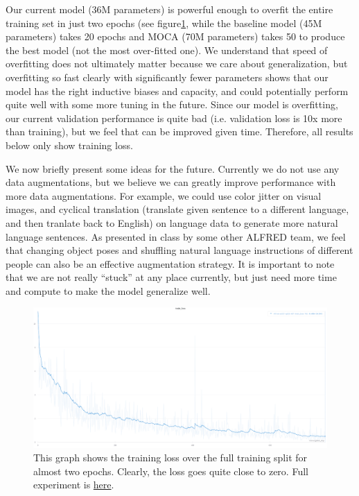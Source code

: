 \documentclass[11pt,a4paper]{article}
\begin{document}
Our current model (36M parameters) is powerful enough to overfit the entire training set in just two epochs (see figure\ref{fig:overfit}, while the baseline model (45M parameters) takes 20 epochs and MOCA (70M parameters) takes 50 to produce the best model (not the most over-fitted one). We understand that speed of overfitting does not ultimately matter because we care about generalization, but overfitting so fast clearly with significantly fewer parameters shows that our model has the right inductive biases and capacity, and could potentially perform quite well with some more tuning in the future. Since our model is overfitting, our current validation performance is quite bad (i.e. validation loss is 10x more than training), but we feel that can be improved given time. Therefore, all results below only show training loss.

We now briefly present some ideas for the future. Currently we do not use any data augmentations, but we believe we can greatly improve performance with more data augmentations. For example, we could use color jitter on visual images, and cyclical translation (translate given sentence to a different language, and then tranlate back to English) on language data to generate more natural language sentences. As presented in class by some other ALFRED team, we feel that changing object poses and shuffling natural language instructions of different people can also be an effective augmentation strategy. It is important to note that we are not really ``stuck'' at any place currently, but just need more time and compute to make the model generalize well.

\begin{figure}
    \centering
    \includegraphics[scale=0.13]{figures/loss_curve.png}
    \caption{This graph shows the training loss over the full training split for almost two epochs. Clearly, the loss goes quite close to zero. Full experiment is \href{https://wandb.ai/tars-alfred/group-tars-alfred/runs/21ktm5uf}{here}.}
    \label{fig:overfit}
\end{figure}
\end{document}
